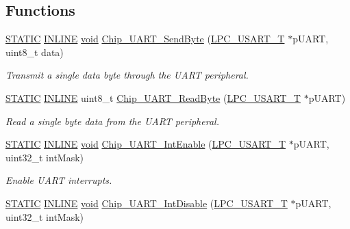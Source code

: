 \subsection*{Functions}
\begin{DoxyCompactItemize}
\item 
\hyperlink{group__LPC__Types__Public__Macros_ga10b2d890d871e1489bb02b7e70d9bdfb}{S\-T\-A\-T\-I\-C} \hyperlink{group__LPC__Types__Public__Types_ga2eb6f9e0395b47b8d5e3eeae4fe0c116}{I\-N\-L\-I\-N\-E} \hyperlink{Paradigm_2Tern__EE_2small_2portmacro_8h_a14d32f8130d3c0b212cfc751730b5b49}{void} \hyperlink{group__UART__17XX__40XX_gaa600b8621d1425b1b493238a68f38088}{Chip\-\_\-\-U\-A\-R\-T\-\_\-\-Send\-Byte} (\hyperlink{structLPC__USART__T}{L\-P\-C\-\_\-\-U\-S\-A\-R\-T\-\_\-\-T} $\ast$p\-U\-A\-R\-T, uint8\-\_\-t data)
\begin{DoxyCompactList}\small\item\em Transmit a single data byte through the U\-A\-R\-T peripheral. \end{DoxyCompactList}\item 
\hyperlink{group__LPC__Types__Public__Macros_ga10b2d890d871e1489bb02b7e70d9bdfb}{S\-T\-A\-T\-I\-C} \hyperlink{group__LPC__Types__Public__Types_ga2eb6f9e0395b47b8d5e3eeae4fe0c116}{I\-N\-L\-I\-N\-E} uint8\-\_\-t \hyperlink{group__UART__17XX__40XX_ga8eec9067080637eea7ecfedac6586fe9}{Chip\-\_\-\-U\-A\-R\-T\-\_\-\-Read\-Byte} (\hyperlink{structLPC__USART__T}{L\-P\-C\-\_\-\-U\-S\-A\-R\-T\-\_\-\-T} $\ast$p\-U\-A\-R\-T)
\begin{DoxyCompactList}\small\item\em Read a single byte data from the U\-A\-R\-T peripheral. \end{DoxyCompactList}\item 
\hyperlink{group__LPC__Types__Public__Macros_ga10b2d890d871e1489bb02b7e70d9bdfb}{S\-T\-A\-T\-I\-C} \hyperlink{group__LPC__Types__Public__Types_ga2eb6f9e0395b47b8d5e3eeae4fe0c116}{I\-N\-L\-I\-N\-E} \hyperlink{Paradigm_2Tern__EE_2small_2portmacro_8h_a14d32f8130d3c0b212cfc751730b5b49}{void} \hyperlink{group__UART__17XX__40XX_ga5a816f48dc294f330cc2cc7b32f9e88b}{Chip\-\_\-\-U\-A\-R\-T\-\_\-\-Int\-Enable} (\hyperlink{structLPC__USART__T}{L\-P\-C\-\_\-\-U\-S\-A\-R\-T\-\_\-\-T} $\ast$p\-U\-A\-R\-T, uint32\-\_\-t int\-Mask)
\begin{DoxyCompactList}\small\item\em Enable U\-A\-R\-T interrupts. \end{DoxyCompactList}\item 
\hyperlink{group__LPC__Types__Public__Macros_ga10b2d890d871e1489bb02b7e70d9bdfb}{S\-T\-A\-T\-I\-C} \hyperlink{group__LPC__Types__Public__Types_ga2eb6f9e0395b47b8d5e3eeae4fe0c116}{I\-N\-L\-I\-N\-E} \hyperlink{Paradigm_2Tern__EE_2small_2portmacro_8h_a14d32f8130d3c0b212cfc751730b5b49}{void} \hyperlink{group__UART__17XX__40XX_gaf92136333a1b6efdfd40e96f97d4a24e}{Chip\-\_\-\-U\-A\-R\-T\-\_\-\-Int\-Disable} (\hyperlink{structLPC__USART__T}{L\-P\-C\-\_\-\-U\-S\-A\-R\-T\-\_\-\-T} $\ast$p\-U\-A\-R\-T, uint32\-\_\-t int\-Mask)

\end{DoxyCompactItemize}
